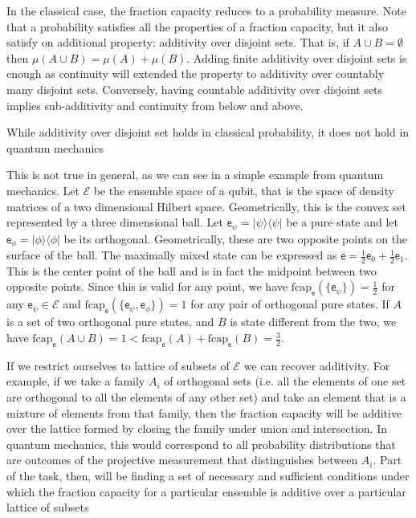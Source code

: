 \documentclass[10pt,twocolumn, nofootinbib]{revtex4-2}
\newcommand\frcap{\mathrm{fcap}}
\newcommand{\ens}[1][e] {\mathsf{#1}} %
\newcommand{\Ens}[1][E] {\mathcal{#1}} %
\def\>{\rangle}
\def\<{\langle}
\begin{document}
In the classical case, the fraction capacity reduces to a probability measure. Note that a probability satisfies all the properties of a fraction capacity, but it also satisfy on additional property: additivity over disjoint sets. That is, if $A \cup B = \emptyset$ then $\mu(A \cup B) = \mu(A) + \mu(B)$. Adding finite additivity over disjoint sets is enough as continuity will extended the property to additivity over countably many disjoint sets. Conversely, having countable additivity over disjoint sets implies sub-additivity and continuity from below and above. 



While additivity over disjoint set holds in classical probability, it does not hold in quantum mechanics

 This is not true in general, as we can see in a simple example from quantum mechanics. Let $\Ens$ be the ensemble space of a qubit, that is the space of density matrices of a two dimensional Hilbert space. Geometrically, this is the convex set represented by a three dimensional ball. Let $\ens_{\psi} = |\psi\>\<\psi|$ be a pure state and let $\ens_{\phi} = |\phi\>\<\phi|$ be its orthogonal. Geometrically, these are two opposite points on the surface of the ball. The maximally mixed state can be expressed as $\ens = \frac{1}{2} \ens_0 + \frac{1}{2} \ens_1$. This is the center point of the ball and is in fact the midpoint between two opposite points. Since this is valid for any point, we have $\frcap_{\ens}(\{\ens_{\psi}\})=\frac{1}{2}$ for any $\ens_{\psi} \in \Ens$ and $\frcap_{\ens}(\{\ens_{\psi}, \ens_{\phi}\})=1$ for any pair of orthogonal pure states. If $A$ is a set of two orthogonal pure states, and $B$ is state different from the two, we have $\frcap_{\ens}(A \cup B) = 1 < \frcap_{\ens}(A) + \frcap_{\ens}(B) = \frac{3}{2}$.

If we restrict ourselves to lattice of subsets of $\Ens$ we can recover additivity. For example, if we take a family $A_i$ of orthogonal sets (i.e. all the elements of one set are orthogonal to all the elements of any other set) and take an element that is a mixture of elements from that family, then the fraction capacity will be additive over the lattice formed by closing the family under union and intersection. In quantum mechanics, this would correspond to all probability distributions that are outcomes of the projective measurement that distinguishes between $A_i$. Part of the task, then, will be finding a set of necessary and sufficient conditions under which the fraction capacity for a particular ensemble is additive over a particular lattice of subsets
\end{document}
